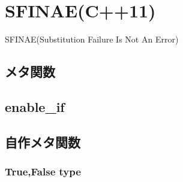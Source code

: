 \section{SFINAE(C++11)}
SFINAE(Substitution Failure Is Not An Error)






\subsection{メタ関数}

\subsection{enable\_if}

\subsection{自作メタ関数}


\subsubsection{True,False type}


